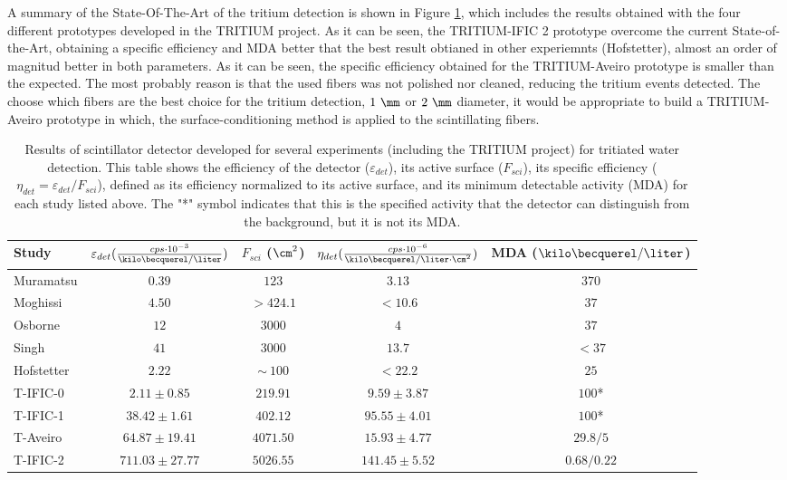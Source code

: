 \begin{itemize}
A summary of the State-Of-The-Art of the tritium detection is shown in Figure \ref{tab:ComparisonResultsTritium}, which includes the results obtained with the four different prototypes developed in the TRITIUM project. As it can be seen, the TRITIUM-IFIC 2 prototype overcome the current State-of-the-Art, obtaining a specific efficiency and MDA better that the best result obtianed in other experiemnts (Hofstetter), almost an order of magnitud better in both parameters. As it can be seen, the specific efficiency obtained for the TRITIUM-Aveiro prototype is smaller than the expected. The most probably reason is that the used fibers was not polished nor cleaned, reducing the tritium events detected. The choose which fibers are the best choice for the tritium detection, $1~\mm$ or $2~\mm$ diameter, it would be appropriate to build a TRITIUM-Aveiro prototype in which, the surface-conditioning method is applied to the scintillating fibers.

\begin{table}[htbp]
\centering{}%
\begin{tabular}{lcccc}
\toprule 
Study & \parbox{5.5em}{$\varepsilon_{det}(\frac{cps \cdot{} 10^{-3}}{\kilo\becquerel/\liter})$}  & \parbox{4.5em}{$F_{sci}$ ($\cm^2$)}  & \parbox{6.5em}{$\eta_{det}(\frac{cps \cdot{} 10^{-6}}{\kilo\becquerel/ \liter \cdot{} \cm^2})$} & MDA ($\kilo\becquerel / \liter$) \tabularnewline
\midrule
\midrule 
Muramatsu & $0.39$ & $123$ & $3.13$ & $370$ \tabularnewline
Moghissi & $4.50$ & $>424.1$ & $<10.6$ & $37$ \tabularnewline
Osborne & $12$ & $3000$ & $4$ & $37$ \tabularnewline
Singh & $41$ & $3000$ & $13.7$ & $<37$ \tabularnewline
Hofstetter & $2.22$ & $\sim~100$ & $<22.2$ & $25$ \tabularnewline
T-IFIC-0 & $2.11 \pm 0.85$ & $219.91$ & $9.59 \pm 3.87$ & $100$* \tabularnewline
T-IFIC-1 & $38.42 \pm 1.61$ & $402.12$ & $95.55 \pm 4.01$ & $100$* \tabularnewline
T-Aveiro & $64.87 \pm 19.41$ & $4071.50$ & $15.93 \pm 4.77$ & $29.8/5$ \tabularnewline
T-IFIC-2 & $711.03 \pm 27.77$ & $5026.55$ & $141.45 \pm 5.52$ & $0.68/0.22$ \tabularnewline
\bottomrule
\end{tabular}
\caption{Results of scintillator detector developed for several experiments (including the TRITIUM project) for tritiated water detection. This table shows the efficiency of the detector ($\varepsilon_{det}$), its active surface ($F_{sci}$), its specific efficiency ($\eta_{det}=\varepsilon_{det}/F_{sci}$), defined as its efficiency normalized to its active surface, and its minimum detectable activity (MDA) for each study listed above. The "*" symbol indicates that this is the specified activity that the detector can distinguish from the background, but it is not its MDA.}
\label{tab:ComparisonResultsTritium}
\end{table}

\end{itemize}

